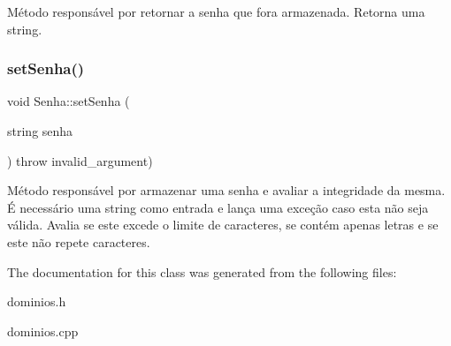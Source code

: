 Método responsável por retornar a senha que fora armazenada. Retorna uma string. \mbox{\label{classSenha_a735e4bf5f65cc8d28daa7dbf202fd999}} 
\subsubsection{\texorpdfstring{set\+Senha()}{setSenha()}}
{\footnotesize\ttfamily void Senha\+::set\+Senha (\begin{DoxyParamCaption}\item[{string}]{senha }\end{DoxyParamCaption}) throw  invalid\+\_\+argument) }

Método responsável por armazenar uma senha e avaliar a integridade da mesma. É necessário uma string como entrada e lança uma exceção caso esta não seja válida. Avalia se este excede o limite de caracteres, se contém apenas letras e se este não repete caracteres. 

The documentation for this class was generated from the following files\+:\begin{DoxyCompactItemize}
\item 
dominios.\+h\item 
dominios.\+cpp\end{DoxyCompactItemize}
